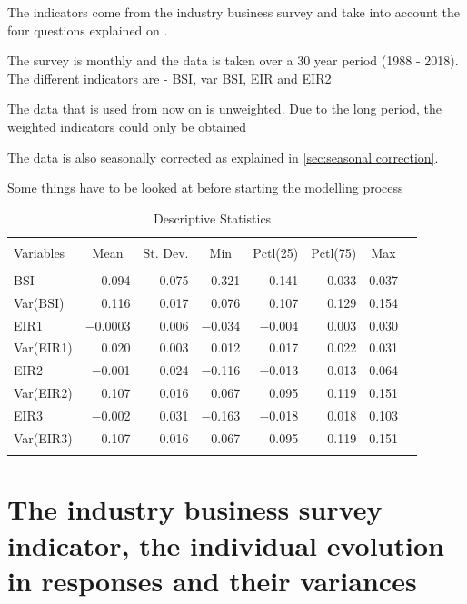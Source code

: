 \documentclass[12pt,a4paper,oneside]{book}
\begin{document}
The indicators come from the industry business survey and take into account the four questions explained on .

The survey is monthly and the data is taken over a 30 year period (1988 - 2018). The different indicators are 
- BSI, var BSI, EIR and EIR2

The data that is used from now on is unweighted. Due to the long period, the weighted indicators could only be obtained 

The data is also seasonally corrected as explained in \autoref{sec:seasonal correction}.

Some things have to be looked at before starting the modelling process


\begin{table}[!htbp] \centering 
  \caption{Descriptive Statistics} 
  \label{tab:descriptive stats} 
\begin{tabular}{@{\extracolsep{5pt}}lrrrrrrr} 
\\[-1.8ex]\hline 
\hline \\[-1.8ex] 
Variables & \multicolumn{1}{c}{Mean} & \multicolumn{1}{c}{St. Dev.} & \multicolumn{1}{c}{Min} & \multicolumn{1}{c}{Pctl(25)} & \multicolumn{1}{c}{Pctl(75)} & \multicolumn{1}{c}{Max} \\ 
\hline \\[-1.8ex] 
BSI & $-$0.094 & 0.075 & $-$0.321 & $-$0.141 & $-$0.033 & 0.037 \\ 
Var(BSI) & 0.116 & 0.017 & 0.076 & 0.107 & 0.129 & 0.154 \\ 
EIR1 & $-$0.0003 & 0.006 & $-$0.034 & $-$0.004 & 0.003 & 0.030 \\ 
Var(EIR1) & 0.020 & 0.003 & 0.012 & 0.017 & 0.022 & 0.031 \\ 
EIR2 & $-$0.001 & 0.024 & $-$0.116 & $-$0.013 & 0.013 & 0.064 \\ 
Var(EIR2) & 0.107 & 0.016 & 0.067 & 0.095 & 0.119 & 0.151 \\ 
EIR3 & $-$0.002 & 0.031 & $-$0.163 & $-$0.018 & 0.018 & 0.103 \\ 
Var(EIR3) & 0.107 & 0.016 & 0.067 & 0.095 & 0.119 & 0.151 \\ 
\hline \\[-1.8ex] 
\end{tabular} 
\end{table} 

\section{The industry business survey indicator, the individual evolution in responses and their variances}
\end{document}
